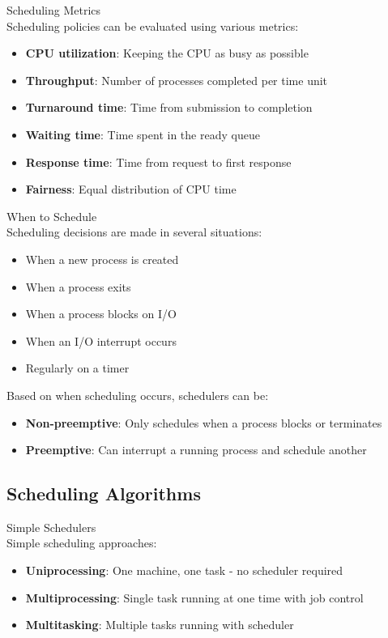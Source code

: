 \begin{definition}{Scheduling Metrics}\\
    Scheduling policies can be evaluated using various metrics:
    \begin{itemize}
        \item \textbf{CPU utilization}: Keeping the CPU as busy as possible
        \item \textbf{Throughput}: Number of processes completed per time unit
        \item \textbf{Turnaround time}: Time from submission to completion
        \item \textbf{Waiting time}: Time spent in the ready queue
        \item \textbf{Response time}: Time from request to first response
        \item \textbf{Fairness}: Equal distribution of CPU time
    \end{itemize}
\end{definition}

\begin{definition}{When to Schedule}\\
    Scheduling decisions are made in several situations:
    \begin{itemize}
        \item When a new process is created
        \item When a process exits
        \item When a process blocks on I/O
        \item When an I/O interrupt occurs
        \item Regularly on a timer
    \end{itemize}
    
    Based on when scheduling occurs, schedulers can be:
    \begin{itemize}
        \item \textbf{Non-preemptive}: Only schedules when a process blocks or terminates
        \item \textbf{Preemptive}: Can interrupt a running process and schedule another
    \end{itemize}
\end{definition}

\subsection{Scheduling Algorithms}

\begin{definition}{Simple Schedulers}\\
    Simple scheduling approaches:
    \begin{itemize}
        \item \textbf{Uniprocessing}: One machine, one task - no scheduler required
        \item \textbf{Multiprocessing}: Single task running at one time with job control
        \item \textbf{Multitasking}: Multiple tasks running with scheduler
    \end{itemize}
\end{definition}

